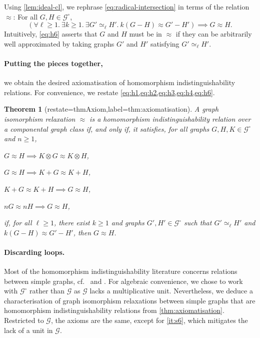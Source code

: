 \documentclass[11pt]{scrartcl}
\theoremstyle{definition}
\theoremstyle{plain}
\newtheorem{theorem}[definition]{Theorem}
\theoremstyle{remark}
\newcommand{\lG}{\mathcal{G}^\circ}
\newcommand{\G}{\mathcal{G}}
\begin{document}
	Using \cref{lem:ideal-cl},
	we rephrase \cref{eq:radical-intersection} in terms of the relation $\approx$:
	For all $G, H \in \lG$,
	\begin{equation}\label{eq:h6}
		\left( \forall \ell \geq 1.\ \exists k \geq 1.\  \exists G' \simeq_\ell H'.\  k(G-H) \approx G' - H' \right) \implies G \approx H.
	\end{equation}
	Intuitively, \eqref{eq:h6} asserts that $G$ and $H$ must be in $\approx$ if they can be arbitrarily well approximated by taking graphs $G'$ and $H'$ satisfying $G' \simeq_\ell H'$. 
	
	\paragraph{Putting the pieces together, } 
	we obtain the desired axiomatisation of homomorphism indistinguishability relations.
	For convenience, we restate \cref{eq:h1,eq:h2,eq:h3,eq:h4,eq:h6}.

	\begin{theorem}[restate=thmAxiom,label=thm:axiomatisation]
		A graph isomorphism relaxation $\approx$ is a homomorphism indistinguishability relation over a componental graph class if, and only if, it satisfies, for all graphs $G, H, K \in \lG$ and $n \geq 1$,
		\begin{assertions}
			\item\label{it:a1} $G \approx H \implies K \otimes G \approx K \otimes H$,
			\item\label{it:a2} $G \approx H \implies K + G \approx K + H$,
			\item\label{it:a3} $K + G \approx K + H \implies G \approx H$,
			\item\label{it:a4} $nG \approx nH \implies G \approx H$, 
\item\label{it:a5} if, for all $\ell \geq 1$, there exist $k \geq 1$ and graphs $G', H' \in \lG$ such that $G' \simeq_\ell H'$ and $k(G-H) \approx G' - H'$, then $G \approx H$.
		\end{assertions}
	\end{theorem}


    \paragraph{Discarding loops.}
    Most of the homomorphism indistinguishability literature concerns relations between simple graphs, cf.\ \cite[Section~7]{roberson_oddomorphisms_2022} and \cite[p.~32]{seppelt_homomorphism_2024}. 
    For algebraic convenience, we chose to work with $\lG$ rather than $\G$ as $\G$ lacks a multiplicative unit. 
    Nevertheless, we deduce a characterisation of graph isomorphism relaxations between simple graphs that are homomorphism indistinguishability relations from \cref{thm:axiomatisation}.
    Restricted to $\G$, the axioms are the same, except for \cref{it:s6}, which  mitigates the lack of a unit in $\G$.
    
\end{document}
